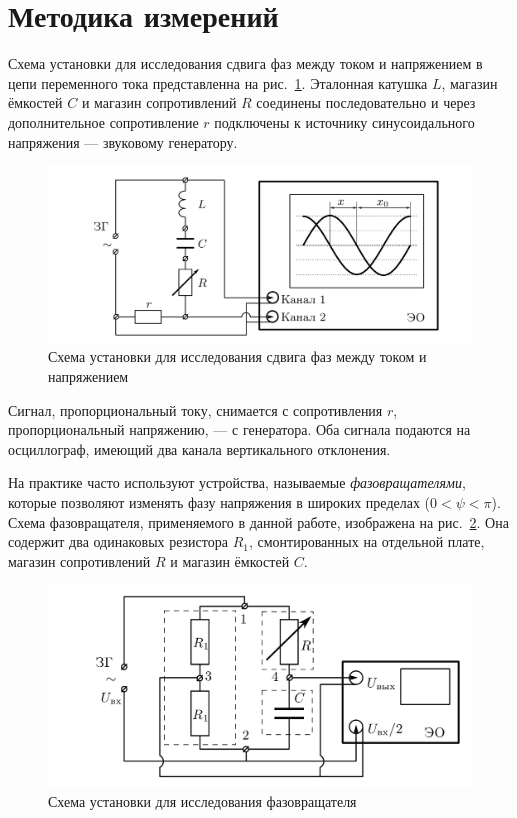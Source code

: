 \documentclass[a4paper, 12pt]{article}
\begin{document}
\section{Методика измерений}

Схема установки для исследования сдвига фаз между током и напряжением в цепи переменного тока представленна на рис.~\ref{r2}. Эталонная катушка $L$, магазин ёмкостей $C$ и магазин сопротивлений $R$ соединены последовательно и через дополнительное сопротивление $r$ подключены к источнику синусоидального напряжения --- звуковому генератору.

\begin{figure}[h!]
\begin{flushleft}
    \includegraphics[scale=2.3]{2.png}
\end{flushleft}
\caption{Схема установки для исследования сдвига фаз между током и напряжением}
\label{r2}
\end{figure}

Сигнал, пропорциональный току, снимается с сопротивления $r$, пропорциональный напряжению, --- с генератора. Оба сигнала подаются на осциллограф, имеющий два канала вертикального отклонения.

На практике часто используют устройства, называемые \textit{фазовращателями}, которые позволяют изменять фазу напряжения в широких пределах ($0 < \psi < \pi$). Схема фазовращателя, применяемого в данной работе, изображена на рис.~\ref{r3}. Она содержит два одинаковых резистора $R_1$, смонтированных на отдельной плате, магазин сопротивлений $R$ и магазин ёмкостей $C$.

\begin{figure}[h!]
\begin{flushleft}
    \includegraphics[scale=2.2]{3.png}
\end{flushleft}
\caption{Схема установки для исследования фазовращателя}
\label{r3}
\end{figure}
\end{document}
